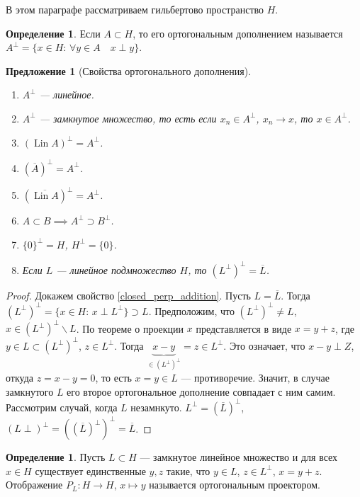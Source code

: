\documentclass[11pt,openany,a4paper]{scrartcl}
\theoremstyle{plain}
\newtheorem{proposition}[theorem]{Предложение}
\theoremstyle{definition}
\newtheorem{definition}[theorem]{Определение}
\newcommand\ol{\overline}
\DeclareMathOperator{\Lin}{Lin}
\begin{document}
В этом параграфе рассматриваем гильбертово пространство $H$.

\begin{definition}
    Если $A \subset H$, то его ортогональным дополнением называется
    $A^\perp = \{x \in H:\,\forall y \in A\quad x\perp y\}$.
\end{definition}
\begin{proposition}[Свойства ортогонального дополнения]
\mbox{}
    \begin{enumerate}
        \item $A^\perp$ — линейное.
        \item $A^\perp$ — замкнутое множество, то есть если $x_n \in A^\perp$,
        $x_n \to x$, то $x \in A^\perp$.
        \item $(\Lin A)^\perp = A^\perp$.
        \item $(\ol A)^\perp = A^\perp$.
        \item $(\ol{\Lin A})^\perp = A^\perp$.
        \item $A\subset B \implies A^\perp \supset B^\perp$.
        \item $\{0\}^\perp = H$, $H^\perp = \{0\}$.
        \item\label{closed_perp_addition} Если $L$ — линейное подмножество $H$,
        то $(L^\perp)^\perp = \ol L$.
    \end{enumerate}
\end{proposition}
\begin{proof}
    Докажем свойство \ref{closed_perp_addition}. Пусть $L = \ol L$. Тогда
    $(L^\perp)^\perp = \{x \in H:\, x\perp L^\perp\} \supset L$.
    Предположим, что
    $(L^\perp)^\perp \neq L$, $x \in (L^\perp)^\perp \backslash L$.
    По теореме о проекции $x$ представляется в виде $x = y + z$, где
    $y \in L \subset (L^\perp)^\perp$,
    $z \in L^\perp$. Тогда
    $\underbrace{x - y}_{\in (L^\perp)^\perp} = z \in L^\perp$. Это означает,
    что $x-y \perp Z$, откуда $z = x - y = 0$, то есть $x = y \in L$ — 
    противоречие. Значит, в случае замкнутого $L$ его второе ортогональное 
    дополнение совпадает с ним самим. Рассмотрим случай, когда $L$ незамнкуто.
    $L^\perp = (\ol L)^\perp$, $(L\perp)^\perp = ((\ol L)^\perp)^\perp = \ol L$.
\end{proof}

\begin{definition}
    Пусть $L \subset H$ — замкнутое линейное множество и для всех $x \in H$
    существует единственные $y, z$ такие, что $y \in L$, $z \in L^\perp$,
    $x = y + z$. Отображение $P_L: H \to H$, $x \mapsto y$
    называется ортогональным проектором.
\end{definition}
\end{document}
